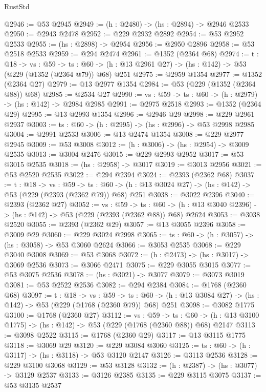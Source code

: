 \begin{lexlean}{RustStd}
\begin{coremodule}
@2946 := @53 @2945
@2949 := (h : @2480) -> (hs : @2894) -> @2946 @2533
@2950 := @2943 @2478
@2952 := @229 @2932 @2892
@2954 := @53 @2952 @2533
@2955 := (hs : @2898) -> @2954
@2956 := @2950 @2896
@2958 := @53 @2518 @2533
@2959 := @294 @2474
@2961 := @1352 (@2364 @68)
@2974 := {t : @18} ->
  {vs : @59} ->
  {ts : @60} -> (h : @13 @2961 @27) -> (hs : @142) -> @53 (@229 (@1352 (@2364 @79)) @68) @251
@2975 := @2959 @1354
@2977 := @1352 (@2364 @27)
@2979 := @13 @2977 @1354
@2984 := @53 (@229 (@1352 (@2364 @88)) @68)
@2985 := @2534 @27
@2990 := {vs : @59} -> {ts : @60} -> (h : @2979) -> (hs : @142) -> @2984 @2985
@2991 := @2975 @2518
@2993 := @1352 (@2364 @29)
@2995 := @13 @2993 @1354
@2996 := @2946 @29
@2998 := @229 @2961 @2937
@3003 := {ts : @60} -> (h : @2995) -> (hs : @2996) -> @53 @2998 @2985
@3004 := @2991 @2533
@3006 := @13 @2474 @1354
@3008 := @229 @2977 @2945
@3009 := @53 @3008
@3012 := (h : @3006) -> (hs : @2954) -> @3009 @2535
@3013 := @3004 @2476
@3015 := @229 @2993 @2952
@3017 := @53 @3015 @2535
@3018 := (hs : @2958) -> @3017
@3019 := @3013 @2956
@3021 := @53 @2520 @2535
@3022 := @294 @2394
@3024 := @2393 (@2362 @68)
@3037 := {t : @18} ->
  {vs : @59} ->
  {ts : @60} -> (h : @13 @3024 @27) -> (hs : @142) -> @53 (@229 (@2393 (@2362 @79)) @68) @251
@3038 := @3022 @2396
@3040 := @2393 (@2362 @27)
@3052 := {vs : @59} ->
  {ts : @60} -> (h : @13 @3040 @2396) -> (hs : @142) -> @53 (@229 (@2393 (@2362 @88)) @68) @2624
@3053 := @3038 @2520
@3055 := @2393 (@2362 @29)
@3057 := @13 @3055 @2396
@3058 := @3009 @29
@3060 := @229 @3024 @2998
@3065 := {ts : @60} -> (h : @3057) -> (hs : @3058) -> @53 @3060 @2624
@3066 := @3053 @2535
@3068 := @229 @3040 @3008
@3069 := @53 @3068
@3072 := (h : @2473) -> (hs : @3017) -> @3069 @2536
@3073 := @3066 @2471
@3075 := @229 @3055 @3015
@3077 := @53 @3075 @2536
@3078 := (hs : @3021) -> @3077
@3079 := @3073 @3019
@3081 := @53 @2522 @2536
@3082 := @294 @2384
@3084 := @1768 (@2360 @68)
@3097 := {t : @18} ->
  {vs : @59} ->
  {ts : @60} -> (h : @13 @3084 @27) -> (hs : @142) -> @53 (@229 (@1768 (@2360 @79)) @68) @251
@3098 := @3082 @1775
@3100 := @1768 (@2360 @27)
@3112 := {vs : @59} ->
  {ts : @60} -> (h : @13 @3100 @1775) -> (hs : @142) -> @53 (@229 (@1768 (@2360 @88)) @68) @2147
@3113 := @3098 @2522
@3115 := @1768 (@2360 @29)
@3117 := @13 @3115 @1775
@3118 := @3069 @29
@3120 := @229 @3084 @3060
@3125 := {ts : @60} -> (h : @3117) -> (hs : @3118) -> @53 @3120 @2147
@3126 := @3113 @2536
@3128 := @229 @3100 @3068
@3129 := @53 @3128
@3132 := (h : @2387) -> (hs : @3077) -> @3129 @2537
@3133 := @3126 @2385
@3135 := @229 @3115 @3075
@3137 := @53 @3135 @2537

\end{coremodule}
\end{lexlean}
